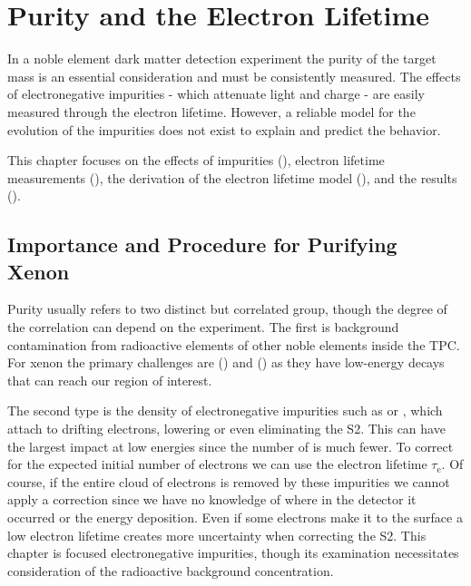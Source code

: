 

\pagestyle{cu}
\graphicspath{{./Chapter4/Figures/}}
\chapter[Purity and the Electron Lifetime][Purity and the Electron Lifetime]{Purity and the Electron Lifetime}
\label{chap:purification}

In a noble element dark matter detection experiment the purity of the target mass is an essential consideration and must be consistently
measured.  The effects of electronegative impurities - which attenuate light and charge - are easily measured through the electron
lifetime.  However, a reliable model for the evolution of the impurities does not exist to explain and predict the behavior.

This chapter focuses on the effects of impurities (), electron lifetime measurements
(), the derivation of the electron lifetime model (), and
the results (\secref{}).



\section{Importance and Procedure for Purifying Xenon}
\label{sec:importance_procedure}
Purity usually refers to two distinct but correlated group, though the degree of the correlation can depend on the
experiment.  The first is background contamination from radioactive elements of other noble elements inside the TPC.  For xenon
the primary challenges are  () and 
() as they have low-energy decays that can reach our region of interest.

The second type is the density of electronegative impurities such as  or
, which attach to drifting electrons, lowering or even eliminating the S2.  This can have the largest impact at low energies
since the number of \electron is much fewer.  To correct for the expected initial number of electrons we can use the electron lifetime
$\tau_{\mathrm{e}}$.  Of course, if the entire cloud of electrons is
removed by these impurities we cannot apply a correction since we have no knowledge of where in the detector it occurred or the energy
deposition.  Even if some electrons make it to the surface a low electron lifetime creates more uncertainty when correcting the S2.  This
chapter is focused electronegative impurities, though its examination necessitates consideration of the radioactive background
concentration.



